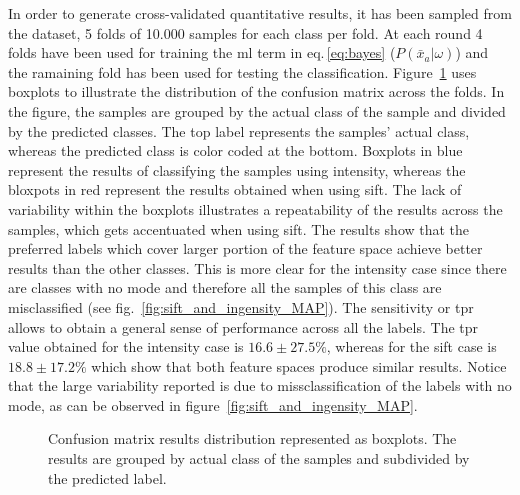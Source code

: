 \documentclass[a4paper, 10pt, conference]{llncs}      %
\begin{document}
In order to generate cross-validated quantitative results, it has been sampled from the dataset, 5 folds of 10.000 samples for each class per fold. At each round 4 folds have been used for training the \ac{ml} term in eq.\,\ref{eq:bayes} ($P(\bar{x}_a|\omega)$) and the ramaining fold has been used for testing the classification. Figure~\ref{fig:quantitativeComparison} uses boxplots to illustrate the distribution of the confusion matrix across the folds. In the figure, the samples are grouped by the actual class of the sample and divided by the predicted classes. The top label represents the samples' actual class, whereas the predicted class is color coded at the bottom. Boxplots in blue represent the results of classifying the samples using intensity, whereas the bloxpots in red represent the results obtained when using \ac{sift}. The lack of variability within the boxplots illustrates a repeatability of the results across the samples, which gets accentuated when using \ac{sift}. The results show that the preferred labels which cover larger portion of the feature space achieve better results than the other classes. This is more clear for the intensity case since there are classes with no mode and therefore all the samples of this class are misclassified (see fig.~\ref{fig:sift_and_ingensity_MAP}). The sensitivity or \ac{tpr} allows to obtain a general sense of performance across all the labels. The \ac{tpr} value obtained for the intensity case is $16.6\pm27.5\%$, whereas for the \ac{sift} case is $18.8\pm17.2\%$ which show that both feature spaces produce similar results. Notice that the large variability reported is due to missclassification of the labels with no mode, as can be observed in figure~\ref{fig:sift_and_ingensity_MAP}.



\begin{figure}[Htbp]

 
\caption{Confusion matrix results distribution represented as boxplots. The results are grouped by actual class of the samples and subdivided by the predicted label.}
\label{fig:quantitativeComparison}
\end{figure}
\end{document}

